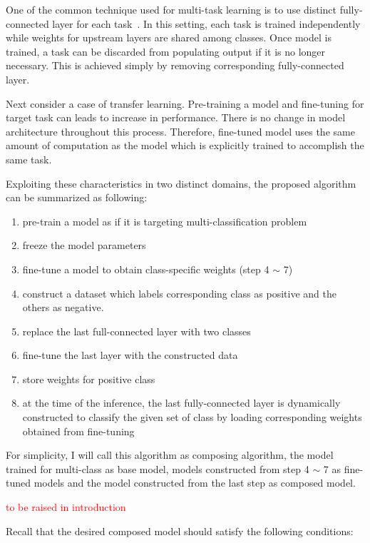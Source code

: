 \documentclass{article}
\newcommand{\red}[1]{\textcolor{red}{#1}}
\begin{document}
One of the common technique used for multi-task learning is to use distinct fully-connected layer for each task~\cite{huang2016mtnet, girshick2015fast, long2017learning}. In this setting, each task is trained independently while weights for upstream layers are shared among classes. Once model is trained, a task can be discarded from populating output if it is no longer necessary. This is achieved simply by removing corresponding fully-connected layer.

Next consider a case of transfer learning. Pre-training a model and fine-tuning for target task can leads to increase in performance. There is no change in model architecture throughout this process. Therefore, fine-tuned model uses the same amount of computation as the model which is explicitly trained to accomplish the same task.

Exploiting these characteristics in two distinct domains, the proposed algorithm can be summarized as following:

\begin{enumerate}
    \item pre-train a model as if it is targeting multi-classification problem
    \item freeze the model parameters
    \item fine-tune a model to obtain class-specific weights (step 4 $\sim$ 7)
    \item construct a dataset which labels corresponding class as positive and the others as negative.
    \item replace the last full-connected layer with two classes
    \item fine-tune the last layer with the constructed data
    \item store weights for positive class
    \item at the time of the inference, the last fully-connected layer is dynamically constructed to classify the given set of class by loading corresponding weights obtained from fine-tuning
\end{enumerate}

For simplicity, I will call this algorithm as composing algorithm, the model trained for multi-class as base model, models constructed from step 4 $\sim$ 7 as fine-tuned models and the model constructed from the last step as composed model.

\red{to be raised in introduction}

Recall that the desired composed model should satisfy the following conditions:
\end{document}

